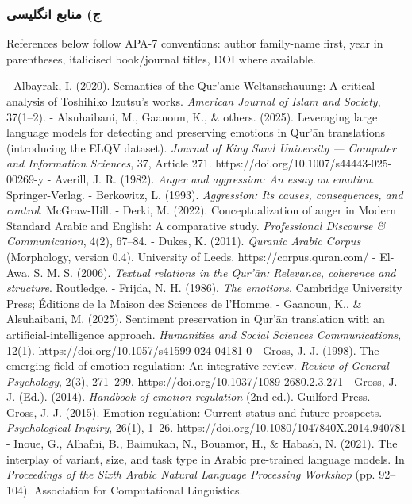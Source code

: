 \documentclass[12pt,a4paper]{article}
\begin{document}
\begin{RTL}
\begin{otherlanguage}{persian}
\subsubsection{ج) منابع
انگلیسی}\label{ux62c-ux645ux646ux627ux628ux639-ux627ux646ux6afux644ux6ccux633ux6cc}

\begin{LTR}

\noindent References below follow APA-7 conventions: author family-name first, year in parentheses, italicised book/journal titles, DOI where available.

- Albayrak, I. (2020). Semantics of the Qur’ānic Weltanschauung: A critical analysis of Toshihiko Izutsu’s works. \emph{American Journal of Islam and Society}, 37(1–2).
- Alsuhaibani, M., Gaanoun, K., \& others. (2025). Leveraging large language models for detecting and preserving emotions in Qur’ān translations (introducing the ELQV dataset). \emph{Journal of King Saud University — Computer and Information Sciences}, 37, Article 271. https://doi.org/10.1007/s44443-025-00269-y
- Averill, J. R. (1982). \emph{Anger and aggression: An essay on emotion}. Springer-Verlag.
- Berkowitz, L. (1993). \emph{Aggression: Its causes, consequences, and control}. McGraw-Hill.
- Derki, M. (2022). Conceptualization of anger in Modern Standard Arabic and English: A comparative study. \emph{Professional Discourse \& Communication}, 4(2), 67–84.
- Dukes, K. (2011). \emph{Quranic Arabic Corpus} (Morphology, version 0.4). University of Leeds. https://corpus.quran.com/
- El-Awa, S. M. S. (2006). \emph{Textual relations in the Qur’ān: Relevance, coherence and structure}. Routledge.
- Frijda, N. H. (1986). \emph{The emotions}. Cambridge University Press; Éditions de la Maison des Sciences de l’Homme.
- Gaanoun, K., \& Alsuhaibani, M. (2025). Sentiment preservation in Qur’ān translation with an artificial-intelligence approach. \emph{Humanities and Social Sciences Communications}, 12(1). https://doi.org/10.1057/s41599-024-04181-0
- Gross, J. J. (1998). The emerging field of emotion regulation: An integrative review. \emph{Review of General Psychology}, 2(3), 271–299. https://doi.org/10.1037/1089-2680.2.3.271
- Gross, J. J. (Ed.). (2014). \emph{Handbook of emotion regulation} (2nd ed.). Guilford Press.
- Gross, J. J. (2015). Emotion regulation: Current status and future prospects. \emph{Psychological Inquiry}, 26(1), 1–26. https://doi.org/10.1080/1047840X.2014.940781
- Inoue, G., Alhafni, B., Baimukan, N., Bouamor, H., \& Habash, N. (2021). The interplay of variant, size, and task type in Arabic pre-trained language models. In \emph{Proceedings of the Sixth Arabic Natural Language Processing Workshop} (pp. 92–104). Association for Computational Linguistics.

\end{LTR}
\end{otherlanguage}
\end{RTL}
\end{document}
